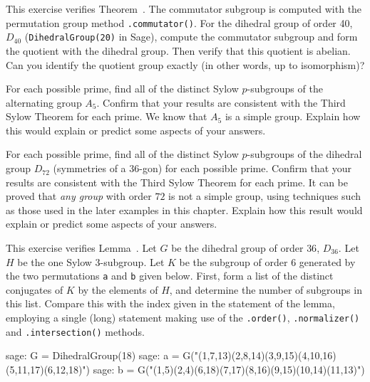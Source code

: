\begin{sageverbatim}\end{sageverbatim}
%
%
This exercise verifies Theorem~.  The commutator subgroup is computed with the permutation group method \verb?.commutator()?.  For the dihedral group of order 40, $D_{40}$ (\verb?DihedralGroup(20)? in Sage), compute the commutator subgroup and form the quotient with the dihedral group.  Then verify that this quotient is abelian.  Can you identify the quotient group exactly (in other words, up to isomorphism)?
\begin{sageverbatim}\end{sageverbatim}
%
%
For each possible prime, find all of the distinct Sylow $p$-subgroups of the alternating group $A_5$.  Confirm that your results are consistent with the Third Sylow Theorem for each prime.  We know that $A_5$ is a simple group.  Explain how this would explain or predict some aspects of your answers.
\begin{sageverbatim}\end{sageverbatim}
%
%
For each possible prime, find all of the distinct Sylow $p$-subgroups of the dihedral group $D_{72}$ (symmetries of a $36$-gon) for each possible prime.  Confirm that your results are consistent with the Third Sylow Theorem for each prime.  It can be proved that {\em any group} with order $72$ is not a simple group, using techniques such as those used in the later examples in this chapter.  Explain how this result would explain or predict some aspects of your answers.\begin{sageverbatim}\end{sageverbatim}
%
%
This exercise verifies Lemma~.  Let $G$ be the dihedral group of order $36$, $D_{36}$.  Let $H$ be the one Sylow $3$-subgroup.  Let $K$ be the subgroup of order $6$ generated by the two permutations \verb?a? and \verb?b? given below.  First, form a list of the distinct conjugates of $K$ by the elements of $H$, and determine the number of subgroups in this list.  Compare this with the index given in the statement of the lemma, employing a single (long) statement making use of the \verb?.order()?, \verb?.normalizer()? and \verb?.intersection()? methods.\par
%
\begin{sageexample}
sage: G = DihedralGroup(18)
sage: a = G("(1,7,13)(2,8,14)(3,9,15)(4,10,16)(5,11,17)(6,12,18)")
sage: b = G("(1,5)(2,4)(6,18)(7,17)(8,16)(9,15)(10,14)(11,13)")
\end{sageexample}
